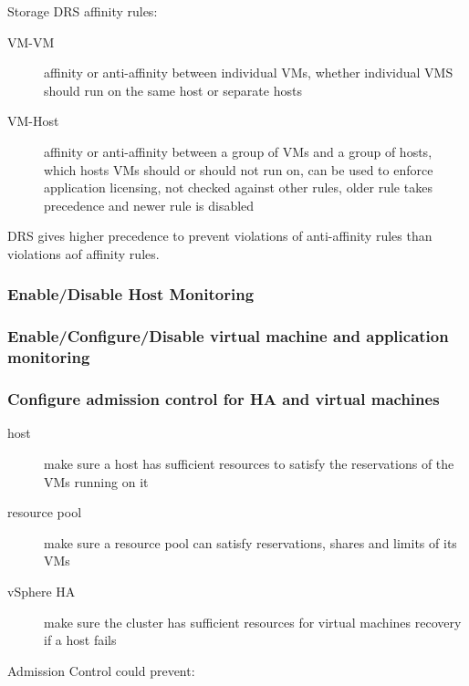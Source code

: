 Storage DRS affinity rules:

\begin{description}

\item[VM-VM]
affinity or anti-affinity between individual VMs, whether individual VMS
should run on the same host or separate hosts

\item[VM-Host]
affinity or anti-affinity between a group of VMs and a group of hosts,
which hosts VMs should or should not run on, can be used to enforce
application licensing, not checked against other rules, older rule takes
precedence and newer rule is disabled

\end{description}

DRS gives higher precedence to prevent violations of anti-affinity rules than
violations aof affinity rules.

\subsubsection{Enable/Disable Host Monitoring}

\subsubsection{Enable/Configure/Disable virtual machine and application monitoring}

\subsubsection{Configure admission control for HA and virtual machines}

\begin{description}

\item[host]
make sure a host has sufficient resources to satisfy the reservations of the
VMs running on it

\item[resource pool]
make sure a resource pool can satisfy reservations, shares and limits of its
VMs

\item[vSphere HA]
make sure the cluster has sufficient resources for virtual machines recovery
if a host fails

\end{description}

Admission Control could prevent:

